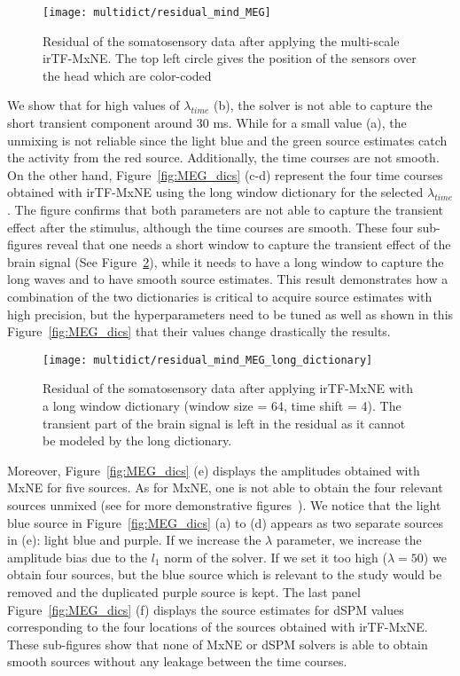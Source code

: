 \begin{figure}
\centering
	\texttt{[image: multidict/residual\_mind\_MEG]}
    \caption{Residual of the somatosensory data after applying the multi-scale irTF-MxNE. The top left circle gives the position of the sensors over the head which are color-coded}
    \label{fig:residual_mind}
\end{figure}

We show that for high values of $\lambda_{time}$ (b), the solver is not able to capture the short transient component around 30 ms. While for a small value (a), the unmixing is not reliable since the light blue and the green source estimates catch the activity from the red source. Additionally, the time courses are not smooth. On the other hand, Figure~\ref{fig:MEG_dics} (c-d) represent the four time courses obtained with irTF-MxNE using the long window dictionary for the selected $\lambda_{time}$. The figure confirms that both parameters are not able to capture the transient effect after the stimulus, although the time courses are smooth. These four sub-figures reveal that one needs a short window to capture the transient effect of the brain signal (See Figure~\ref{fig:residual_long_dic}), while it needs to have a long window to capture the long waves and to have smooth source estimates. This result demonstrates how a combination of the two dictionaries is critical to acquire source estimates with high precision, but the hyperparameters need to be tuned as well as shown in this Figure~\ref{fig:MEG_dics} that their values change drastically the results.

\begin{figure}
\centering
	\texttt{[image: multidict/residual\_mind\_MEG\_long\_dictionary]}
    \caption{Residual of the somatosensory data after applying irTF-MxNE with a long window dictionary (window size = 64, time shift = 4). The transient part of the brain signal is left in the residual as it cannot be modeled by the long dictionary.}
    \label{fig:residual_long_dic}
\end{figure}

Moreover, Figure~\ref{fig:MEG_dics} (e) displays the amplitudes obtained with MxNE for five sources. As for MxNE, one is not able to obtain the four relevant sources unmixed (see for more demonstrative figures~\cite{gramfort2012mixed}). We notice that the light blue source in Figure~\ref{fig:MEG_dics} (a) to (d) appears as two separate sources in (e): light blue and purple. If we increase the $\lambda$ parameter, we increase the amplitude bias due to the $l_1$ norm of the solver. If we set it too high ($\lambda=50$) we obtain four sources, but the blue source which is relevant to the study would be removed and the duplicated purple source is kept. The last panel Figure~\ref{fig:MEG_dics} (f) displays the source estimates for dSPM values corresponding to the four locations of the sources obtained with irTF-MxNE. These sub-figures show that none of MxNE or dSPM solvers is able to obtain smooth sources without any leakage between the time courses.

